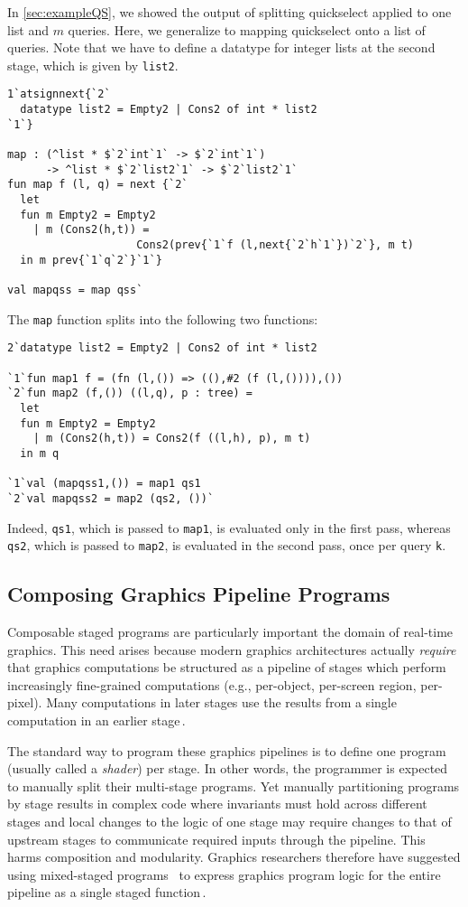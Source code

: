 In \ref{sec:exampleQS}, we showed the output of splitting quickselect
applied to one list and $m$ queries.  Here, we generalize to mapping
quickselect onto a list of queries. Note that we have to define a
datatype for integer lists at the second stage, which is given by
\texttt{list2}.
\begin{lstlisting} 
1`atsignnext{`2`
  datatype list2 = Empty2 | Cons2 of int * list2
`1`}

map : (^list * $`2`int`1` -> $`2`int`1`)
      -> ^list * $`2`list2`1` -> $`2`list2`1`
fun map f (l, q) = next {`2`
  let 
  fun m Empty2 = Empty2
    | m (Cons2(h,t)) =
                    Cons2(prev{`1`f (l,next{`2`h`1`})`2`}, m t)
  in m prev{`1`q`2`}`1`}

val mapqss = map qss`
\end{lstlisting}
The \texttt{map} function splits into the following two functions:
\begin{lstlisting} 
2`datatype list2 = Empty2 | Cons2 of int * list2

`1`fun map1 f = (fn (l,()) => ((),#2 (f (l,()))),())
`2`fun map2 (f,()) ((l,q), p : tree) =
  let 
  fun m Empty2 = Empty2
    | m (Cons2(h,t)) = Cons2(f ((l,h), p), m t) 
  in m q

`1`val (mapqss1,()) = map1 qs1
`2`val mapqss2 = map2 (qs2, ())`
\end{lstlisting}
%
Indeed, \texttt{qs1}, which is passed to \texttt{map1}, is evaluated only in the
first pass, whereas \texttt{qs2}, which is passed to \texttt{map2}, is evaluated
in the second pass, once per query \texttt{k}.

\subsection{Composing Graphics Pipeline Programs}
\label{sec:graphics}

Composable staged programs are particularly important the domain of real-time graphics.
This need arises because modern graphics architectures actually
\emph{require} that graphics computations be structured as a pipeline
of stages which perform increasingly fine-grained computations (e.g.,
per-object, per-screen region, per-pixel). Many computations in later
stages use the results from a single computation in an earlier
stage\,\cite{OpenGL4Spec}.

The standard way to program these graphics pipelines is to define one program (usually called a \emph{shader}) per stage.
In other words, the programmer is expected to manually split their multi-stage programs.
Yet manually partitioning programs by stage results in
complex code where invariants must hold across different stages and
local changes to the logic of one stage may require changes to that of
upstream stages to communicate required inputs through the pipeline. 
This harms composition and modularity.  
Graphics researchers therefore have suggested using mixed-staged programs
\,\cite{Proudfoot:2001,Foley:2011,He:2014} to express graphics program logic 
for the entire pipeline as a single staged function\,\cite{Foley:2011}.

